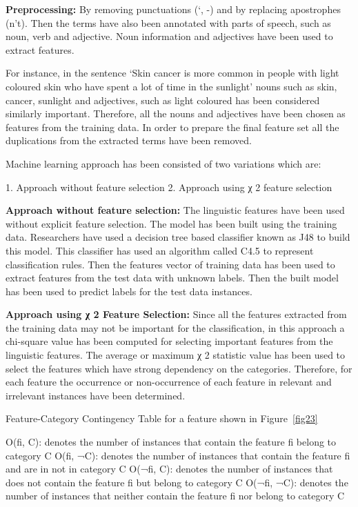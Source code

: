 \documentclass[]{article}
\begin{document}
\textbf{Preprocessing:} By removing punctuations (‘, -) and by replacing apostrophes (n’t). Then the terms have also been annotated with parts of speech, such as noun, verb and adjective. Noun information and adjectives have been used to extract features.  

For instance, in the sentence ‘Skin cancer is more common in people with light coloured skin who have spent a lot of time in the sunlight’ nouns such as skin, cancer, sunlight and adjectives, such as light coloured has been considered similarly important. Therefore, all the nouns and adjectives have been chosen as features from the training data. In order to prepare the final feature set all the duplications from the extracted terms have been removed. 
    
Machine learning approach has been consisted of two variations which are:

1.	Approach without feature selection
2.	Approach using χ 2 feature selection

\textbf{Approach without feature selection:} The linguistic features have been used without explicit feature selection. The model has been built using the training data. Researchers have used a decision tree based classifier known as J48 to build this model. This classifier has used an algorithm called C4.5 to represent classification rules. Then the features vector of training data has been used to extract features from the test data with unknown labels. Then the built model has been used to predict labels for the test data instances.

\textbf{Approach using χ 2 Feature Selection:} Since all the features extracted from the training data may not be important for the classification, in this approach a chi-square value has been computed for selecting  important features from the linguistic features. The average or maximum χ 2 statistic value has been used to select the features which have strong dependency on the categories. Therefore, for each feature the occurrence or non-occurrence of each feature in relevant and irrelevant instances have been determined. 

Feature-Category Contingency Table for a feature shown in Figure~\ref{fig23}

O(fi, C): denotes the number of instances that contain the feature fi belong to category C
O(fi, ¬C): denotes the number of instances that contain the feature fi and are in not in category C 
O(¬fi, C): denotes the number of instances that does not contain the feature fi but belong to category C
O(¬fi, ¬C): denotes the number of instances that neither contain the feature fi nor belong to category C
\end{document}
